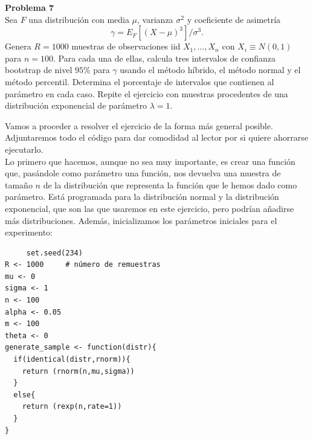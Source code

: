 \documentclass[a4paper]{article}
\newenvironment{problem}[2][Problema]
    { \begin{mdframed}[backgroundcolor=gray!20] \textbf{#1 #2} \\}
    {  \end{mdframed}}
\begin{document}
   \begin{problem}{7}
     Sea \(F\) una distribución con media \(\mu\), varianza \(\sigma^2\) y coeficiente de asimetría
     \[
     \gamma = E_F[(X-\mu)^3]/\sigma^3.
     \]
     Genera \(R=1000\) muestras de observaciones iid \(X_1,\dots,X_n\) con \(X_i \equiv N(0,1)\) para \(n=100\). Para cada una de ellas, calcula tres intervalos de confianza bootstrap de nivel \(95\%\) para \(\gamma\) usando el método híbrido, el método normal y el método percentil. Determina el porcentaje de intervalos que contienen al parámetro en cada caso. Repite el ejercicio con muestras procedentes de una distribución exponencial de parámetro \(\lambda=1\).
   \end{problem}

   Vamos a proceder a resolver el ejercicio de la forma más general posible. Adjuntaremos todo el código para dar comodidad al lector por si quiere ahorrarse ejecutarlo.\\

   Lo primero que hacemos, aunque no sea muy importante, es crear una función que, pasándole como parámetro una función, nos devuelva una muestra de tamaño \(n\) de la distribución que representa la función que le hemos dado como parámetro. Está programada para la distribución normal y la distribución exponencial, que son las que usaremos en este ejercicio, pero podrían añadirse más distribuciones. Además, inicializamos los parámetros iniciales para el experimento:
   \begin{verbatim}
     set.seed(234)
R <- 1000     # número de remuestras
mu <- 0
sigma <- 1
n <- 100
alpha <- 0.05
m <- 100
theta <- 0
generate_sample <- function(distr){
  if(identical(distr,rnorm)){
    return (rnorm(n,mu,sigma))
  }
  else{
    return (rexp(n,rate=1))
  }
}
   \end{verbatim}
\end{document}
